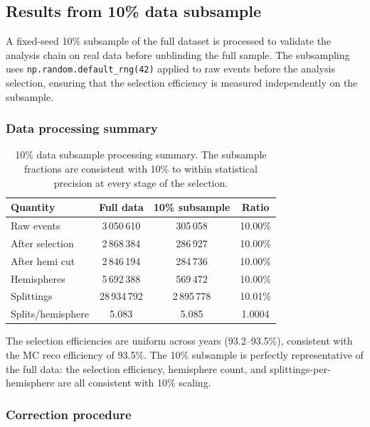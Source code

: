 \documentclass[11pt,a4paper]{article}
\begin{document}
\subsection{Results from 10\% data subsample}
\label{sec:results-10pct}

A fixed-seed 10\% subsample of the full dataset is processed to validate
the analysis chain on real data before unblinding the full sample.
The subsampling uses \texttt{np.random.default\_rng(42)} applied to raw
events before the analysis selection, ensuring that the selection
efficiency is measured independently on the subsample.

\subsubsection{Data processing summary}

\begin{table}[htbp]
\centering
\caption{10\% data subsample processing summary.  The subsample
  fractions are consistent with 10\% to within statistical precision
  at every stage of the selection.}
\label{tbl:10pct-summary}
\begin{tabular}{lccc}
\toprule
Quantity & Full data & 10\% subsample & Ratio \\
\midrule
Raw events & 3\,050\,610 & 305\,058 & 10.00\% \\
After selection & 2\,868\,384 & 286\,927 & 10.00\% \\
After hemi cut & 2\,846\,194 & 284\,736 & 10.00\% \\
Hemispheres & 5\,692\,388 & 569\,472 & 10.00\% \\
Splittings & 28\,934\,792 & 2\,895\,778 & 10.01\% \\
Splits/hemisphere & 5.083 & 5.085 & 1.0004 \\
\bottomrule
\end{tabular}
\end{table}

The selection efficiencies are uniform across years (93.2--93.5\%),
consistent with the MC reco efficiency of 93.5\%.  The 10\% subsample
is perfectly representative of the full data: the selection efficiency,
hemisphere count, and splittings-per-hemisphere are all consistent with
10\% scaling.

\subsubsection{Correction procedure}
\end{document}
